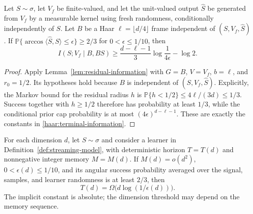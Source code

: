 \begin{lemma}\label{haar:terminal}
Let $S\sim\sigma$, let $V_f$ be finite-valued, and let the unit-valued
output $\widehat S$ be generated from $V_f$ by a measurable kernel using
fresh randomness, conditionally independently of $S$.  Let $B$ be a Haar
$\ell=\lfloor d/4\rfloor$ frame independent of $(S,V_f,\widehat S)$.
If
$\mathbb P\{\arccos\langle\widehat S,S\rangle\le\epsilon\}\ge2/3$
for $0<\epsilon\le1/10$, then
\begin{equation}\label{haar:terminal-information}
 I(S;V_f\mid B,BS)
 \ge\frac{d-\ell-1}{3}\log\frac1{4\epsilon}-\log2.
\end{equation}
\end{lemma}

\begin{proof}
Apply Lemma~\ref{lem:residual-information} with $G=B$, $V=V_f$,
$b=\ell$, and $r_0=1/2$.  Its hypotheses hold because $B$ is independent of
$(S,V_f,\widehat S)$.  Explicitly, the Markov
bound for the residual radius $h$ is
$\mathbb P\{h<1/2\}\le4\ell/(3d)\le1/3$.  Success together with
$h\ge1/2$ therefore has probability at least $1/3$, while the conditional
prior cap probability is at most $(4\epsilon)^{d-\ell-1}$.  These are exactly
the constants in \eqref{haar:terminal-information}.
\end{proof}

\begin{proposition}\label{haar:streaming}
For each dimension $d$, let $S\sim\sigma$ and consider a learner in
Definition~\ref{def:streaming-model}, with deterministic horizon $T=T(d)$
and nonnegative integer memory $M=M(d)$.  If $M(d)=o(d^2)$,
$0<\epsilon(d)\le1/10$, and its angular success probability averaged over
the signal, samples, and learner randomness is at least $2/3$, then
\[
 T(d)=\Omega\bigl(d\log(1/\epsilon(d))\bigr).
\]
The implicit constant is absolute; the dimension threshold may depend on
the memory sequence.
\end{proposition}

